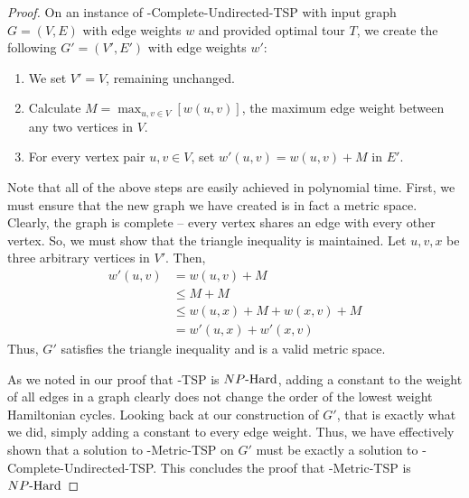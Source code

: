 \begin{proof}
    On an instance of \inob{}-Complete-Undirected-TSP with input graph $G = (V,E)$ with edge weights $w$ and provided optimal tour $T$, we create the following $G' = (V', E')$ with edge weights $w'$:
    \begin{enumerate}
        \item We set $V' = V$, remaining unchanged.
        \item Calculate $M = \max_{u,v\in V}[w(u,v)]$, the maximum edge weight between any two vertices in $V$.
        \item For every vertex pair $u,v \in V$, set $w'(u,v) = w(u,v) + M$ in $E'$.
    \end{enumerate}
    Note that all of the above steps are easily achieved in polynomial time.
    First, we must ensure that the new graph we have created is in fact a metric space. Clearly, the graph is complete -- every vertex shares an edge with every other vertex. So, we must show that the triangle inequality is maintained. Let $u,v,x$ be three arbitrary vertices in $V'$. Then,
    \begin{equation*}
    \begin{split}
              w'(u,v) &= w(u,v) + M  \\
        &\leq M + M \\
        &\leq w(u,x) + M + w(x,v) + M\\
        &= w'(u,x) + w'(x,v)
    \end{split}
    \end{equation*}
    Thus, $G'$ satisfies the triangle inequality and is a valid metric space.
    
    As we noted in our proof that \exob{}-TSP is ${NP\text{-Hard{}}}$, adding a constant to the weight of all edges in a graph clearly does not change the order of the lowest weight Hamiltonian cycles. Looking back at our construction of $G'$, that is exactly what we did, simply adding a constant to every edge weight. Thus, we have effectively shown that a solution to \inob{}-Metric-TSP on $G'$ must be exactly a solution to \inob{}-Complete-Undirected-TSP.  This concludes the proof that \inob{}-Metric-TSP is ${NP\text{-Hard{}}}$
\end{proof}

